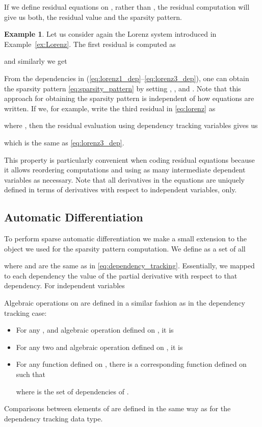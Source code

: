 \documentclass[10pt]{ijnam}
\theoremstyle{definition}
\newtheorem{example}{Example}[section]
\newcommand\xqed[1]{\leavevmode\unskip\penalty9999 \hbox{}\nobreak\hfill \quad\hbox{#1}}
\newcommand{\exampleSymbol}{\xqed{}}
\begin{document}
If we define residual equations on , rather than , the 
residual computation will give us both, the residual value and the sparsity pattern.

\begin{example}
Let us consider again the Lorenz system introduced in Example~\ref{ex:Lorenz}. The first residual is computed as

and similarly we get

From the dependencies in (\ref{eq:lorenz1_dep}--\ref{eq:lorenz3_dep}), one can obtain the sparsity pattern \eqref{eq:sparsity_pattern} by setting , , and . Note that this approach for obtaining the sparsity pattern is independent of how equations are written. If we, for example, write the third residual in \eqref{eq:lorenz} as  

where , then the residual evaluation using dependency tracking variables gives us

which is the same as \eqref{eq:lorenz3_dep}. \exampleSymbol
\end{example}

This property is particularly convenient when coding residual equations because it allows reordering computations and using as many intermediate dependent variables as necessary. Note that all derivatives in the equations are uniquely defined in terms of derivatives with respect to independent variables, only.

\subsection{Automatic Differentiation}

To perform sparse automatic differentiation we make a small extension to the object we used for the sparsity pattern computation. We define 
 as a set of all 

where  and  are the same as in \eqref{eq:dependency_tracking}.
Essentially, we mapped to each dependency the value of the partial derivative with
respect to that dependency. For independent variables 

Algebraic operations on  are defined in a similar 
fashion as in the dependency tracking case:
\begin{itemize}[leftmargin=1em]
\item For any ,  
and algebraic operation  defined on , it is

\item For any two  
and algebraic operation  defined on , it is

\item For any function  defined on , there is a corresponding function 
 defined on  such that

where  is the set of dependencies of .
\end{itemize}
Comparisons between elements of  are defined in the same way as 
for the dependency tracking data type. 
\end{document}
